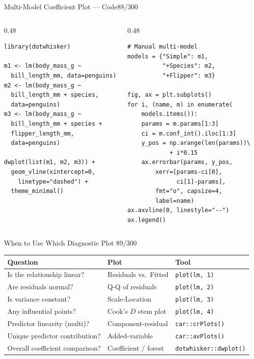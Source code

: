 \documentclass[10pt]{beamer}
\newcommand{\smark}[1]{\hfill{\scriptsize\color{codegray}#1}}
\begin{document}
\begin{frame}[fragile]{Multi-Model Coefficient Plot --- Code}\smark{88/300}
\begin{columns}[T]
\begin{column}{0.48\textwidth}
\begin{lstlisting}[style=Rstyle]
library(dotwhisker)

m1 <- lm(body_mass_g ~
  bill_length_mm, data=penguins)
m2 <- lm(body_mass_g ~
  bill_length_mm + species,
  data=penguins)
m3 <- lm(body_mass_g ~
  bill_length_mm + species +
  flipper_length_mm,
  data=penguins)

dwplot(list(m1, m2, m3)) +
  geom_vline(xintercept=0,
    linetype="dashed") +
  theme_minimal()
\end{lstlisting}
\end{column}
\begin{column}{0.48\textwidth}
\begin{lstlisting}[style=Pystyle]
# Manual multi-model
models = {"Simple": m1,
          "+Species": m2,
          "+Flipper": m3}

fig, ax = plt.subplots()
for i, (name, m) in enumerate(
    models.items()):
    params = m.params[1:3]
    ci = m.conf_int().iloc[1:3]
    y_pos = np.arange(len(params))\
            + i*0.15
    ax.errorbar(params, y_pos,
        xerr=[params-ci[0],
              ci[1]-params],
        fmt="o", capsize=4,
        label=name)
ax.axvline(0, linestyle="--")
ax.legend()
\end{lstlisting}
\end{column}
\end{columns}
\end{frame}

\begin{frame}{When to Use Which Diagnostic Plot}
\smark{89/300}
\centering\small
\begin{tabular}{@{}lll@{}}
    \toprule
    \textbf{Question} & \textbf{Plot} & \textbf{Tool} \\
    \midrule
    Is the relationship linear?    & Residuals vs.\ Fitted  & \texttt{plot(lm, 1)} \\
    Are residuals normal?          & Q-Q of residuals        & \texttt{plot(lm, 2)} \\
    Is variance constant?          & Scale-Location          & \texttt{plot(lm, 3)} \\
    Any influential points?        & Cook's $D$ stem plot    & \texttt{plot(lm, 4)} \\
    Predictor linearity (multi)?   & Component-residual      & \texttt{car::crPlots()} \\
    Unique predictor contribution? & Added-variable          & \texttt{car::avPlots()} \\
    Overall coefficient comparison?& Coefficient / forest    & \texttt{dotwhisker::dwplot()} \\
    \bottomrule
\end{tabular}
\end{frame}
\end{document}
